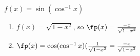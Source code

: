 {$f(x) =\sin(\cos^{-1} x)$
}
{\begin{enumerate}
\item		$f(x) = \sqrt{1-x^2}$, so $\fp(x) = \frac{-x}{\sqrt{1-x^2}}$
\item		$\fp(x) = \cos (\cos^{-1}x)(\frac{1}{\sqrt{1-x^2}} =\frac{-x}{\sqrt{1-x^2}}$
\end{enumerate}
}

